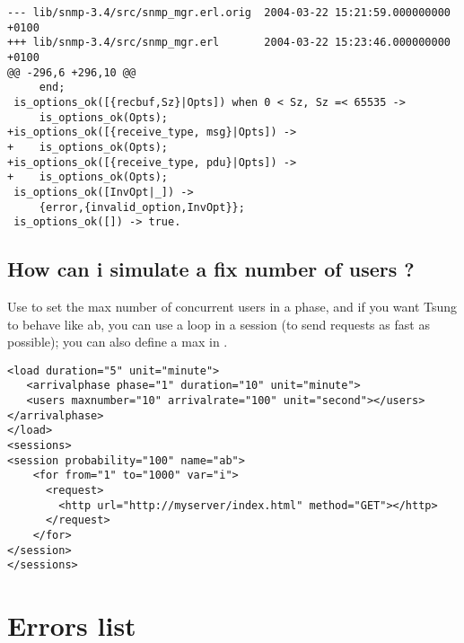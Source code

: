 \documentclass{TSUNG-en}
\begin{document}
\begin{appendix}
\begin{Verbatim}
--- lib/snmp-3.4/src/snmp_mgr.erl.orig  2004-03-22 15:21:59.000000000 +0100
+++ lib/snmp-3.4/src/snmp_mgr.erl       2004-03-22 15:23:46.000000000 +0100
@@ -296,6 +296,10 @@
     end;
 is_options_ok([{recbuf,Sz}|Opts]) when 0 < Sz, Sz =< 65535 ->
     is_options_ok(Opts);
+is_options_ok([{receive_type, msg}|Opts]) ->
+    is_options_ok(Opts);
+is_options_ok([{receive_type, pdu}|Opts]) ->
+    is_options_ok(Opts);
 is_options_ok([InvOpt|_]) ->
     {error,{invalid_option,InvOpt}};
 is_options_ok([]) -> true.
\end{Verbatim}

\subsection{How can i simulate a fix number of users ?}

Use  to set the max number of concurrent users in a
phase, and if you want Tsung to behave like ab, you can use a loop
in a session (to send requests as fast as possible); you can also define a
max   in .


\begin{Verbatim}
<load duration="5" unit="minute">
   <arrivalphase phase="1" duration="10" unit="minute">
   <users maxnumber="10" arrivalrate="100" unit="second"></users>
</arrivalphase>
</load>
<sessions>
<session probability="100" name="ab">
    <for from="1" to="1000" var="i">
      <request>
        <http url="http://myserver/index.html" method="GET"></http>
      </request>
    </for>
</session>
</sessions>

\end{Verbatim}


\section{Errors list}


\end{appendix}
\end{document}

